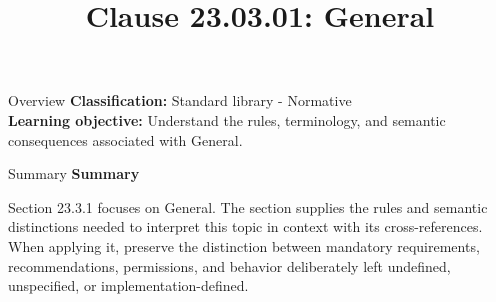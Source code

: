 \documentclass[10pt,letterpaper]{article}
\title{Clause 23.03.01: General}
\author{}
\date{}
\begin{document}
\maketitle
\begin{CornellOverviewBox}{Overview}
\textbf{Classification:} Standard library - Normative\\[2pt]
\textbf{Learning objective:} Understand the rules, terminology, and semantic consequences associated with General.
\end{CornellOverviewBox}\begin{CornellSummaryBox}{Summary}
{\sffamily\bfseries\color{Accent} Summary}\par\vspace{3pt}Section 23.3.1 focuses on General. The section supplies the rules and semantic distinctions needed to interpret this topic in context with its cross-references. When applying it, preserve the distinction between mandatory requirements, recommendations, permissions, and behavior deliberately left undefined, unspecified, or implementation-defined.
\end{CornellSummaryBox}
\end{document}
